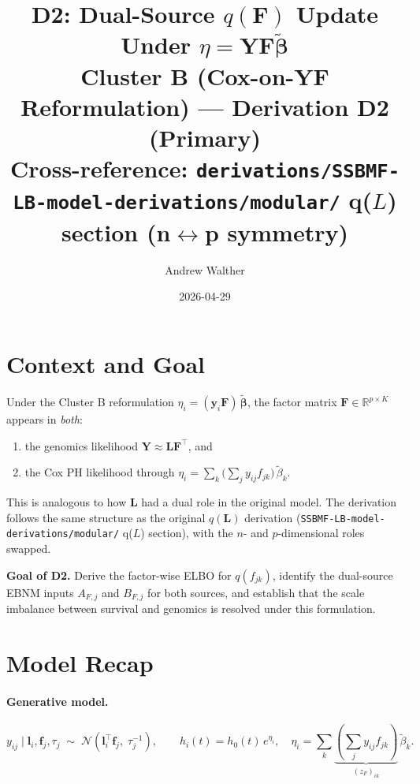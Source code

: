\documentclass[11pt]{article}
\title{\textbf{D2: Dual-Source $q(\mathbf{F})$ Update Under $\eta = \mathbf{Y}\mathbf{F}\tilde{\boldsymbol{\beta}}$}\\[4pt]
\large Cluster B (Cox-on-YF Reformulation) — Derivation D2 (Primary)\\[2pt]
\normalsize Cross-reference: \texttt{derivations/SSBMF-LB-model-derivations/modular/} q($L$) section (n$\leftrightarrow$p symmetry)}
\author{Andrew Walther}
\date{2026-04-29}
\newcommand{\N}{\mathcal{N}}
\begin{document}
\maketitle
\tableofcontents
\newpage

\section{Context and Goal}

Under the Cluster B reformulation $\eta_i = (\mathbf{y}_i \mathbf{F})\,\tilde{\boldsymbol{\beta}}$,
the factor matrix $\mathbf{F} \in \mathbb{R}^{p \times K}$ appears in \emph{both}:
\begin{enumerate}
  \item the genomics likelihood $\mathbf{Y} \approx \mathbf{L}\mathbf{F}^\top$, and
  \item the Cox PH likelihood through $\eta_i = \sum_k \bigl(\sum_j y_{ij} f_{jk}\bigr)\,\tilde{\beta}_k$.
\end{enumerate}

This is analogous to how $\mathbf{L}$ had a dual role in the original model. The derivation
follows the same structure as the original $q(\mathbf{L})$ derivation
(\texttt{SSBMF-LB-model-derivations/modular/} q($L$) section), with the $n$- and $p$-dimensional
roles swapped.

\bigskip
\textbf{Goal of D2.} Derive the factor-wise ELBO for $q(f_{jk})$, identify the dual-source
EBNM inputs $A_{F,j}$ and $B_{F,j}$ for both sources, and establish that the scale imbalance
between survival and genomics is resolved under this formulation.

\section{Model Recap}

\paragraph{Generative model.}
\[
  y_{ij} \mid \mathbf{l}_i, \mathbf{f}_j, \tau_j
  \;\sim\; \N\!\left(\mathbf{l}_i^\top \mathbf{f}_j,\; \tau_j^{-1}\right),
  \qquad
  h_i(t) = h_0(t)\,e^{\eta_i}, \quad
  \eta_i = \sum_k \underbrace{\left(\sum_j y_{ij} f_{jk}\right)}_{(z_F)_{ik}}\,\tilde{\beta}_k.
\]
\end{document}
